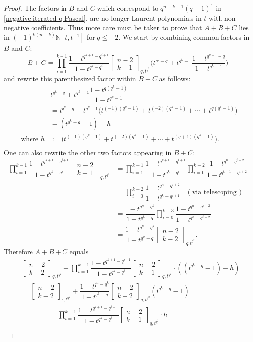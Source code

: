 \documentclass[10pt]{amsart}
\theoremstyle{plain}
\theoremstyle{definition}
\theoremstyle{remark}
\numberwithin{equation}{section}
\newcommand\qbin[3]{\left[\begin{matrix} #1 \\ #2 \end{matrix} \right]_{#3}}
\newcommand\NN{\mathbb{N}}
\begin{document}
\begin{proof}
The factors in $B$ and $C$ which correspond to 
$q^{n-k-1}(q-1)^1$ in  \eqref{negative-iterated-q-Pascal}, 
are no longer Laurent polynomials in $t$ with 
non-negative coefficients. Thus more care 
must be taken to prove that $A+B+C$ lies in
$(-1)^{k(n-k)} \NN[t,t^{-1}]$ for $q \leq -2$.  
We start by combining common factors in $B$ and $C$:
$$
B+C
=\prod_{i=1}^{k-1}\dfrac{1-t^{q^{k+1}-q^{i+1}}}{1-t^{q^{k}-q^{i}}}
    \qbin{n-2}{k-1}{q,t^{q^2}}
     \Big(t^{q^{k}-q}+t^{q^{k}-1} \dfrac{1-t^{q^{k+1}-q}}{1-t^{q^{k}-1}}\Big) 
$$
and rewrite this parenthesized factor within $B+C$ as follows:
$$
\begin{aligned}
&t^{q^{k}-q}+t^{q^{k}-1} \dfrac{1-t^{q(q^{k}-1)}}{1-t^{q^{k}-1}} \\
&=t^{q^{k}-q}-t^{q^{k}-1}\big(t^{(-1)(q^{k}-1)}+t^{(-2)(q^{k}-1)}+\cdots+t^{q(q^{k}-1)}\big)\\
&=(t^{q^{k}-q}-1)- h\\
\text{ where } h
  &:=\big(t^{(-1)(q^{k}-1)}+t^{(-2)(q^{k}-1)}+\cdots+t^{(q+1)(q^{k}-1)}\big).\\
\end{aligned}
$$
One can also rewrite the other two factors appearing in $B+C$:
$$
\begin{aligned}
\prod_{i=1}^{k-1}\dfrac{1-t^{q^{k+1}-q^{i+1}}}{1-t^{q^{k}-q^{i}}} \qbin{n-2}{k-1}{q,t^{q^2}} 
&=\prod_{i=1}^{k-1}\dfrac{1-t^{q^{k+1}-q^{i+1}}}{1-t^{q^{k}-q^{i}}} 
\prod_{i=0}^{k-2}\dfrac{1-t^{q^{n}-q^{i+2}}}{1-t^{q^{k+1}-q^{i+2}}} \\
&=\prod_{i=0}^{k-2}\dfrac{1-t^{q^{n}-q^{i+2}}}{1-t^{q^{k}-q^{i+1}}} \quad \text{( via telescoping )}\\
&=\dfrac{1-t^{q^{n}-q^{k}}}{1-t^{q^{k}-q}}
    \prod_{i=0}^{k-3}\dfrac{1-t^{q^{n}-q^{i+2}}}{1-t^{q^{k}-q^{i+2}}}\\
&=\dfrac{1-t^{q^{n}-q^{k}}}{1-t^{q^{k}-q}}
    \qbin{n-2}{k-2}{q,t^{q^2}}.
\end{aligned}
$$
Therefore $A+B+C$ equals
$$
\begin{aligned}
&\qbin{n-2}{k-2}{q,t^{q^2}} + 
         \prod_{i=1}^{k-1}\dfrac{1-t^{q^{k+1}-q^{i+1}}}{1-t^{q^{k}-q^{i}}}
         \qbin{n-2}{k-1}{q,t^{q^2}} \cdot ((t^{q^{k}-q}-1)- h)  \\
&=\qbin{n-2}{k-2}{q,t^{q^2}} + 
         \dfrac{1-t^{q^{n}-q^{k}}}{1-t^{q^{k}-q}} 
           \qbin{n-2}{k-2}{q,t^{q^2}}(t^{q^{k}-q}-1)\\
&\qquad \qquad 
-       \prod_{i=1}^{k-1}\dfrac{1-t^{q^{k+1}-q^{i+1}}}{1-t^{q^{k}-q^{i}}} 
         \qbin{n-2}{k-1}{q,t^{q^2}} \cdot h  \\

\end{aligned}$$
\end{proof}
\end{document}
